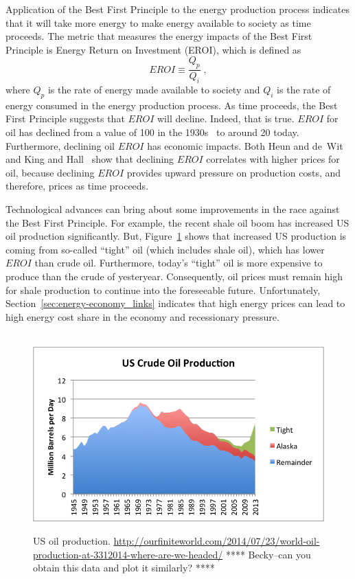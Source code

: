 Application of the Best First Principle to the energy production process 
indicates that it will take more energy 
to make energy available to society as time proceeds.
The metric that measures the energy impacts of the Best First Principle is 
Energy Return on Investment (EROI), which is defined as 
%
\begin{equation}
	EROI \equiv \frac{Q_p}{Q_i} \; ,
\end{equation}
%
where $Q_p$ is the rate of energy made available to society
and $Q_i$ is the rate of energy consumed in the energy production process.
As time proceeds, the Best First Principle suggests that
$EROI$ will decline.
Indeed, that is true.
$EROI$ for oil has declined 
from a value of 100 in the 1930s~\cite[p.~781]{Cleveland:2005uy} 
to around 20 today.\cite[Fig.~2]{Hall:2014aa}
Furthermore, declining oil $EROI$ has economic impacts.
Both Heun and de~Wit~\cite{Heun:2012ek} and King and Hall~\cite{King:2011go}
show that declining $EROI$ correlates with higher prices for oil, 
because declining $EROI$ provides upward pressure on 
production costs, and therefore, prices
as time proceeds.

Technological advances can bring about some improvements 
in the race against the Best First Principle.
For example, the recent shale oil boom has increased US oil production
significantly. 
But, Figure~\ref{fig:US_oil_production} shows that increased US production
is coming from so-called ``tight'' oil (which includes shale oil), 
which has lower $EROI$ than crude oil.
Furthermore, today's ``tight'' oil is more expensive to produce 
than the crude of yesteryear.
Consequently, oil prices must remain high for 
shale production to continue into the foreseeable future. 
Unfortunately, Section~\ref{sec:energy-economy_links} indicates that
high energy prices can lead to high energy cost share in the economy
and recessionary pressure.

\begin{figure}[!ht]
\centering\
\includegraphics[width=\linewidth]{Part_0/Chapter_Introduction/images/us-crude-oil-production-including-tight-oil.png}
\caption[US oil production]{US oil production.
\url{http://ourfiniteworld.com/2014/07/23/world-oil-production-at-3312014-where-are-we-headed/}
**** Becky--can you obtain this data and plot it similarly? ****
}
\label{fig:US_oil_production}
\end{figure}

